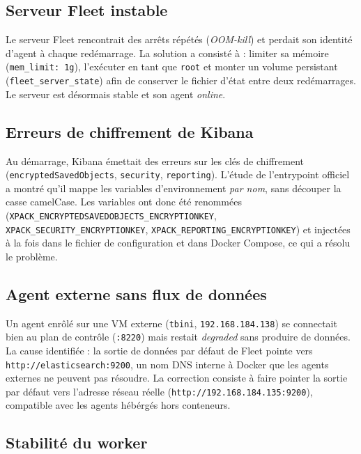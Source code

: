\documentclass[11pt,a4paper]{article}
\begin{document}
\subsection{Serveur Fleet instable}

Le serveur Fleet rencontrait des arr\^ets r\'ep\'et\'es (\emph{OOM-kill}) et
perdait son identit\'e d'agent \`a chaque red\'emarrage. La solution a
consist\'e \`a : limiter sa m\'emoire (\texttt{mem\_limit: 1g}), l'ex\'ecuter
en tant que \texttt{root} et monter un volume persistant
(\texttt{fleet\_server\_state}) afin de conserver le fichier d'\'etat entre
deux red\'emarrages. Le serveur est d\'esormais stable et son agent
\emph{online}.

\subsection{Erreurs de chiffrement de Kibana}

Au d\'emarrage, Kibana \'emettait des erreurs sur les cl\'es de chiffrement
(\texttt{encryptedSavedObjects}, \texttt{security}, \texttt{reporting}).
L'\'etude de l'entrypoint officiel a montr\'e qu'il mappe les variables
d'environnement \emph{par nom}, sans d\'ecouper la casse camelCase. Les
variables ont donc \'et\'e renomm\'ees
(\texttt{XPACK\_ENCRYPTEDSAVEDOBJECTS\_ENCRYPTIONKEY},
\texttt{XPACK\_SECURITY\_ENCRYPTIONKEY},
\texttt{XPACK\_REPORTING\_ENCRYPTIONKEY}) et inject\'ees \`a la fois dans le
fichier de configuration et dans Docker Compose, ce qui a r\'esolu le
probl\`eme.

\subsection{Agent externe sans flux de donn\'ees}

Un agent enr\^ol\'e sur une VM externe (\texttt{tbini},
\texttt{192.168.184.138}) se connectait bien au plan de contr\^ole
(\texttt{:8220}) mais restait \emph{degraded} sans produire de donn\'ees. La
cause identifi\'ee : la sortie de donn\'ees par d\'efaut de Fleet pointe vers
\texttt{http://elasticsearch:9200}, un nom DNS interne \`a Docker que les
agents externes ne peuvent pas r\'esoudre. La correction consiste \`a faire
pointer la sortie par d\'efaut vers l'adresse r\'eseau r\'eelle
(\texttt{http://192.168.184.135:9200}), compatible avec les agents h\'eb\'erg\'es
hors conteneurs.

\subsection{Stabilit\'e du worker}
\end{document}
